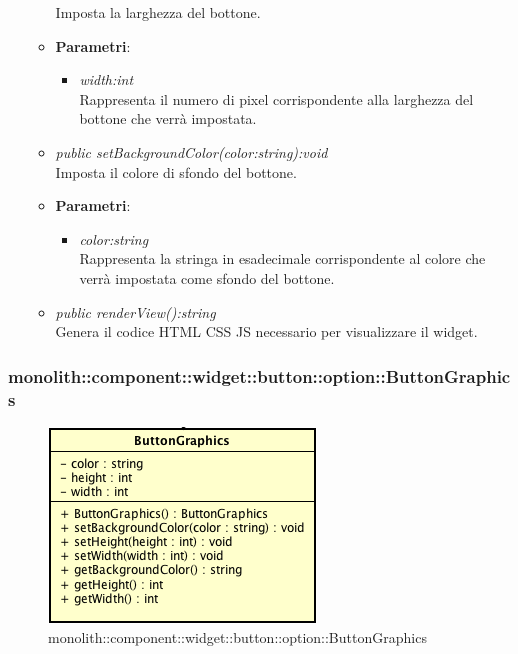 \begin{itemize}
\begin{itemize}
	Imposta la larghezza del bottone.
		\item{\textbf{Parametri}: \begin{itemize}
		\item \textit{width:int}\\
		Rappresenta il numero di pixel corrispondente alla larghezza del bottone che verrà impostata.
		\end{itemize}}
	\item \textit{public setBackgroundColor(color:string):void}\\
	Imposta il colore di sfondo del bottone.
		\item{\textbf{Parametri}: \begin{itemize}
		\item \textit{color:string}\\
		Rappresenta la stringa in esadecimale corrispondente al colore che verrà impostata come sfondo del bottone.
		\end{itemize}}
	\item \textit{public renderView():string}\\
	Genera il codice HTML CSS JS necessario per visualizzare il widget.
	\end{itemize}
\end{itemize}

\subsubsection{monolith::component::widget::button::option::ButtonGraphics}

\label{monolith::component::widget::button::option::ButtonGraphics}
\begin{figure}[ht]
	\centering
	\includegraphics[scale=0.5]{Sezioni/SottosezioniST/img/ButtonGraphics.png}
	\caption{monolith::component::widget::button::option::ButtonGraphics}
\end{figure}

